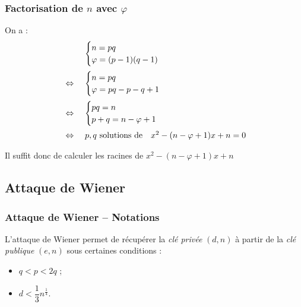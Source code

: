 \documentclass{beamer}
\newcommand{\Emph}{\textcolor{ff4500}}
\newcommand{\N}{\mathbb{N}} %
\newcommand{\ssi}{\ \Leftrightarrow \ }
\begin{document}
    \begin{frame}
        \frametitle{Factorisation de $n$ avec $\varphi$}

        On a :
        \[
            \begin{array}{cl}
                &
                \begin{cases}
                    n = pq
                    \\
                    \varphi = (p - 1)(q - 1)
                \end{cases}
                \vspace{6pt}
                \\
                \ssi
                &
                \begin{cases}
                    n = pq
                    \\
                    \varphi = pq -p -q + 1
                \end{cases}
                \vspace{6pt}
                \\
                \ssi
                &
                \begin{cases}
                    pq = n
                    \\
                    p + q = n - \varphi + 1
                \end{cases}
                \vspace{6pt}
                \\
                \ssi
                &
                p, q\ \text{solutions de} \quad x^2 - (n - \varphi + 1)x + n = 0
            \end{array}
        \]

        Il suffit donc de calculer les racines de \Emph{$x^2 - (n - \varphi + 1)x + n$}
    \end{frame}


    \subsection{Attaque de Wiener}

    \begin{frame}
        \frametitle{Attaque de Wiener -- Notations}

        L'\Emph{attaque de Wiener} permet de récupérer la \Emph{\it clé privée} $(d, n)$ à partir de la \Emph{\it clé publique} $(e, n)$ sous certaines conditions :

        \vspace{12pt}
        
        \begin{itemize}
            \item<2-> $q < p < 2q$ ;


            \item<3-> $d < \dfrac 1 3 n^{\tfrac 1 4}$.
        \end{itemize}
    \end{frame}
\end{document}
